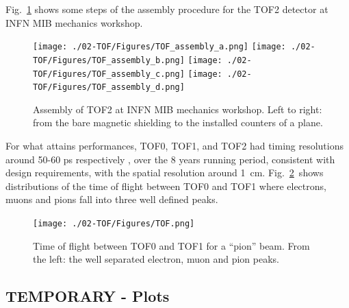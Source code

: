 Fig.~\ref{fig:TOF2} shows some steps of the assembly procedure for the TOF2
detector at INFN MIB mechanics workshop.
\begin{figure}
  \begin{center}
  \texttt{[image: ./02-TOF/Figures/TOF\_assembly\_a.png]}
  \texttt{[image: ./02-TOF/Figures/TOF\_assembly\_b.png]}
  \texttt{[image: ./02-TOF/Figures/TOF\_assembly\_c.png]}
  \texttt{[image: ./02-TOF/Figures/TOF\_assembly\_d.png]}
  \caption{Assembly of TOF2 at INFN MIB mechanics workshop. Left to right: from the bare magnetic shielding to the installed counters of a plane.}
  \label{fig:TOF2}
  \end{center}
\end{figure}




 For what attains performances\malert{---},
TOF0, TOF1, and TOF2 had timing resolutions around 50-60 ps
respectively , over the 8
years running period, consistent with design requirements, with the
spatial resolution around 1~cm.   Fig.~\ref{fig:TOF3}~shows distributions of
the time of flight between TOF0 and TOF1 where electrons, muons and
pions fall into three well defined peaks.
\begin{figure}
  \begin{center}
    \texttt{[image: ./02-TOF/Figures/TOF.png]}
    \caption{Time of flight between TOF0 and TOF1 for a ``pion'' beam. From the left: the well separated electron, muon and pion peaks.}
    \label{fig:TOF3}
  \end{center}
\end{figure}




\subsection{TEMPORARY - Plots}

